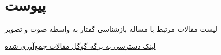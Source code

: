 \chapter*{‌پیوست}

لیست مقالات مرتبط با مساله بازشناسی گفتار به واسطه صوت و تصویر

\href{https://docs.google.com/spreadsheets/d/1Zdd84vojLO7jm_wr2Aev-HX1QdLINjyfSPAFpuWEYVs/edit?usp=sharing}{لینک دسترسی به برگه گوگل مقالات جمع‌آوری شده}